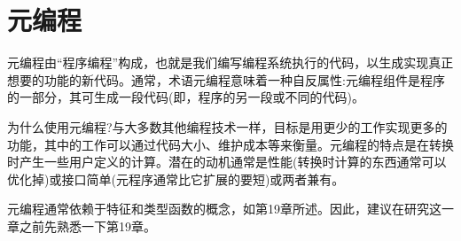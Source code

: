 \chapter{元编程}
元编程由“程序编程”构成，也就是我们编写编程系统执行的代码，以生成实现真正想要的功能的新代码。通常，术语元编程意味着一种自反属性:元编程组件是程序的一部分，其可生成一段代码(即，程序的另一段或不同的代码)。

为什么使用元编程?与大多数其他编程技术一样，目标是用更少的工作实现更多的功能，其中的工作可以通过代码大小、维护成本等来衡量。元编程的特点是在转换时产生一些用户定义的计算。潜在的动机通常是性能(转换时计算的东西通常可以优化掉)或接口简单(元程序通常比它扩展的要短)或两者兼有。

元编程通常依赖于特征和类型函数的概念，如第19章所述。因此，建议在研究这一章之前先熟悉一下第19章。






